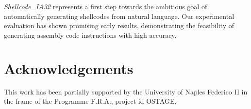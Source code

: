 \documentclass[11pt,a4paper]{article}
\newcommand{\datasetname}[1]{\emph{Shellcode\_IA32}}
\begin{document}
\datasetname{} represents a first step towards the ambitious goal of automatically generating shellcodes from natural language. Our experimental evaluation has shown promising early results, demonstrating the feasibility of generating assembly code instructions with high accuracy. 




 

\section*{Acknowledgements}
This work has been partially supported by the University of Naples Federico II in the frame of the Programme F.R.A., project id OSTAGE. 



\end{document}
